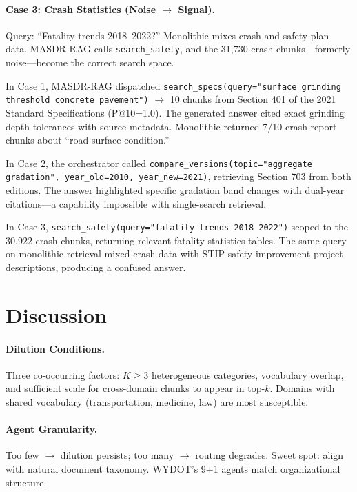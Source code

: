 \documentclass[11pt,a4paper]{article}
\newcommand{\systemname}{\textsc{MASDR-RAG}}
\begin{document}
\paragraph{Case 3: Crash Statistics (Noise $\rightarrow$ Signal).} Query: ``Fatality trends 2018--2022?'' Monolithic mixes crash and safety plan data. \systemname{} calls \texttt{search\_safety}, and the 31,730 crash chunks---formerly noise---become the correct search space.

In Case 1, \systemname{} dispatched \texttt{search\_specs(query="surface grinding threshold concrete pavement")} $\rightarrow$ 10 chunks from Section 401 of the 2021 Standard Specifications (P@10=1.0). The generated answer cited exact grinding depth tolerances with source metadata. Monolithic returned 7/10 crash report chunks about ``road surface condition.''

In Case 2, the orchestrator called \texttt{compare\_versions(topic="aggregate gradation", year\_old=2010, year\_new=2021)}, retrieving Section 703 from both editions. The answer highlighted specific gradation band changes with dual-year citations---a capability impossible with single-search retrieval.

In Case 3, \texttt{search\_safety(query="fatality trends 2018 2022")} scoped to the 30,922 crash chunks, returning relevant fatality statistics tables. The same query on monolithic retrieval mixed crash data with STIP safety improvement project descriptions, producing a confused answer.


\section{Discussion}
\label{sec:discussion}

\paragraph{Dilution Conditions.} Three co-occurring factors: $K \geq 3$ heterogeneous categories, vocabulary overlap, and sufficient scale for cross-domain chunks to appear in top-$k$. Domains with shared vocabulary (transportation, medicine, law) are most susceptible.

\paragraph{Agent Granularity.} Too few $\rightarrow$ dilution persists; too many $\rightarrow$ routing degrades. Sweet spot: align with natural document taxonomy. WYDOT's 9+1 agents match organizational structure.
\end{document}
